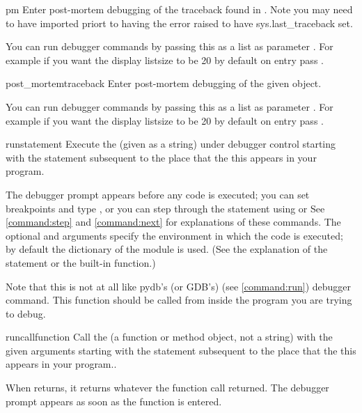 \begin{funcdesc}{pm}{}
Enter post-mortem debugging of the traceback found in
. Note you may need to have 
imported priort to having the error raised to have sys.last_traceback
set.

You can run debugger commands by passing this as a list as parameter
. For example if you want the display listsize to be 20
by default on entry pass .
\end{funcdesc}

\begin{funcdesc}{post_mortem}{traceback }\label{post-mortem}
Enter post-mortem debugging of the given  object.

You can run debugger commands by passing this as a list as parameter
. For example if you want the display listsize to be 20
by default on entry pass .

\end{funcdesc}

\begin{funcdesc}{run}{statement}
Execute the  (given as a string) under debugger
control starting with the statement subsequent to the place that the
this appears in your program.

The debugger prompt appears before any code is executed; you can set
breakpoints and type , or you can step through the
statement using  or  See \ref{command:step} and
\ref{command:next} for explanations of these commands.  The optional
 and  arguments specify the environment in
which the code is executed; by default the dictionary of the module
 is used.  (See the explanation of the
 statement or the  built-in function.)

Note that this is not at all like pydb's (or GDB's)  (see
\ref{command:run}) debugger command. This function should be called
from inside the program you are trying to debug.
\end{funcdesc}

\begin{funcdesc}{runcall}{function}
Call the  (a function or method object, not a string)
with the given arguments starting with the statement subsequent to the
place that the this appears in your program..

When  returns, it returns
whatever the function call returned.  The debugger prompt appears as
soon as the function is entered.
\end{funcdesc}

